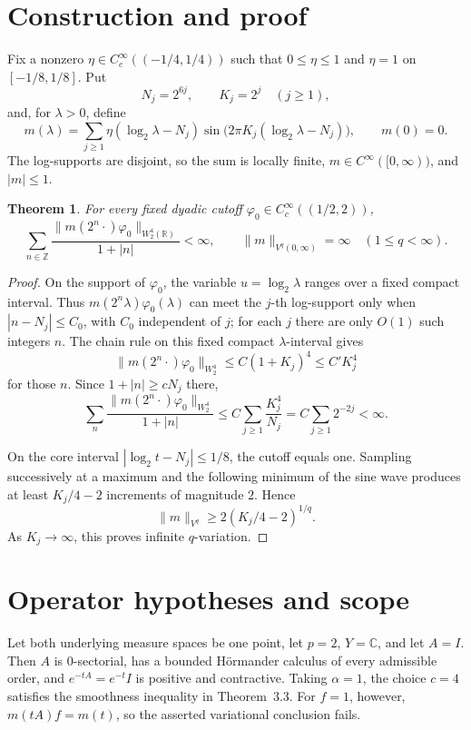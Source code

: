 \documentclass[11pt]{article}
\newtheorem{theorem}{Theorem}
\newcommand{\R}{\mathbb R}
\begin{document}
\section{Construction and proof}
Fix a nonzero \(\eta\in C_c^\infty((-1/4,1/4))\) such that
\(0\le\eta\le1\) and \(\eta=1\) on \([-1/8,1/8]\).  Put
\[
 N_j=2^{6j},\qquad K_j=2^j\quad(j\ge1),
\]
and, for \(\lambda>0\), define
\[
 m(\lambda)=\sum_{j\ge1}
 \eta(\log_2\lambda-N_j)
 \sin\bigl(2\pi K_j(\log_2\lambda-N_j)\bigr),
 \qquad m(0)=0.
\]
The log-supports are disjoint, so the sum is locally finite,
\(m\in C^\infty([0,\infty))\), and \(|m|\le1\).

\begin{theorem}
For every fixed dyadic cutoff
\(\varphi_0\in C_c^\infty((1/2,2))\),
\[
 \sum_{n\in\mathbb Z}
 \frac{\|m(2^n\cdot)\varphi_0\|_{W^4_2(\R)}}{1+|n|}<\infty,
 \qquad \|m\|_{V^q(0,\infty)}=\infty\quad(1\le q<\infty).
\]
\end{theorem}

\begin{proof}
On the support of \(\varphi_0\), the variable \(u=\log_2\lambda\) ranges
over a fixed compact interval.  Thus
\(m(2^n\lambda)\varphi_0(\lambda)\) can meet the \(j\)-th log-support only
when \(|n-N_j|\le C_0\), with \(C_0\) independent of \(j\); for each \(j\)
there are only \(O(1)\) such integers \(n\).  The chain rule on this fixed
compact \(\lambda\)-interval gives
\[
 \|m(2^n\cdot)\varphi_0\|_{W^4_2}
 \le C(1+K_j)^4\le C'K_j^4
\]
for those \(n\).  Since \(1+|n|\ge cN_j\) there,
\[
 \sum_n\frac{\|m(2^n\cdot)\varphi_0\|_{W^4_2}}{1+|n|}
 \le C\sum_{j\ge1}\frac{K_j^4}{N_j}
 =C\sum_{j\ge1}2^{-2j}<\infty.
\]

On the core interval \(|\log_2t-N_j|\le1/8\), the cutoff equals one.
Sampling successively at a maximum and the following minimum of the sine
wave produces at least \(K_j/4-2\) increments of magnitude \(2\).  Hence
\[
 \|m\|_{V^q}\ge2(K_j/4-2)^{1/q}.
\]
As \(K_j\to\infty\), this proves infinite \(q\)-variation.
\end{proof}

\section{Operator hypotheses and scope}
Let both underlying measure spaces be one point, let \(p=2\), \(Y=\mathbb C\),
and let \(A=I\).  Then \(A\) is \(0\)-sectorial, has a bounded
H\"ormander calculus of every admissible order, and \(e^{-tA}=e^{-t}I\) is
positive and contractive.  Taking \(\alpha=1\), the choice \(c=4\) satisfies
the smoothness inequality in Theorem~3.3.  For \(f=1\), however,
\(m(tA)f=m(t)\), so the asserted variational conclusion fails.
\end{document}

